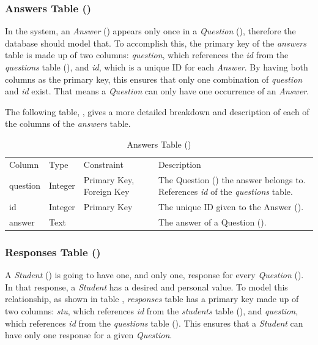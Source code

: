 \documentclass[12pt,letterpaper]{article}
\begin{document}
\subsubsection*{Answers Table ()}
In the system, an \textit{Answer} () appears only once in a \textit{Question} (), therefore the database should model that. To accomplish this, the primary key of the \textit{answers} table is made up of two columns: \textit{question}, which references the \textit{id} from the \textit{questions} table (), and \textit{id}, which is a unique ID for each \textit{Answer}. By having both columns as the primary key, this ensures that only one combination of \textit{question} and \textit{id} exist. That means a \textit{Question} can only have one occurrence of an \textit{Answer}.

The following table, , gives a more detailed breakdown and description of each of the columns of the \textit{answers} table.

\begin{table}[H]
	\caption{Answers Table ()} 
	\begin{tabu} to \textwidth {l l X X[4]}
		\tableheader{}Column & Type & Constraint & Description \\
		question & Integer & Primary Key,\newline
		                     Foreign Key          & The Question () the answer belongs to. References \textit{id} of the 
		                                            \textit{questions} table. \\
		id       & Integer & Primary Key          & The unique ID given to the Answer (). \\
		answer   & Text    &                      & The answer of a Question (). \\
	\end{tabu}
\end{table}

\subsubsection*{Responses Table ()}
A \textit{Student} () is going to have one, and only one, response for every \textit{Question} (). In that response, a \textit{Student} has a desired and personal value. To model this relationship, as shown in table , \textit{responses} table has a primary key made up of two columns: \textit{stu}, which references \textit{id} from the \textit{students} table (), and \textit{question}, which references \textit{id} from the \textit{questions} table (). This ensures that a \textit{Student} can have only one response for a given \textit{Question}.
\end{document}
